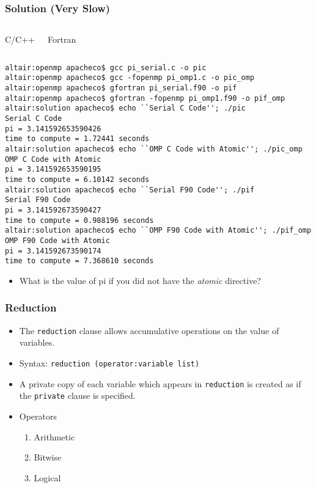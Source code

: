 \documentclass[c,mathserif,compress,xcolor=svgnames]{beamer}
\newenvironment{bblock}[0]
{
\begin{beamerboxesrounded}[upper=uppercol1,lower=lowercol1,shadow=true]}
{\end{beamerboxesrounded}}
\newenvironment{eblock}[0]
{
\begin{beamerboxesrounded}[upper=uppercol2,lower=lowercol2,shadow=true]}
{\end{beamerboxesrounded}}
\begin{document}
\begin{frame}
  \frametitle{\small Solution (Very Slow)}
  \begin{columns}
    \begin{eblock}{C/C++}
      
    \end{eblock}
    \begin{eblock}{Fortran}
      
    \end{eblock}
  \end{columns}
  \begin{bblock}{}
    {\tiny
      \begin{verbatim}
altair:openmp apacheco$ gcc pi_serial.c -o pic
altair:openmp apacheco$ gcc -fopenmp pi_omp1.c -o pic_omp
altair:openmp apacheco$ gfortran pi_serial.f90 -o pif
altair:openmp apacheco$ gfortran -fopenmp pi_omp1.f90 -o pif_omp
altair:solution apacheco$ echo ``Serial C Code''; ./pic
Serial C Code
pi = 3.141592653590426
time to compute = 1.72441 seconds
altair:solution apacheco$ echo ``OMP C Code with Atomic''; ./pic_omp
OMP C Code with Atomic
pi = 3.141592653590195
time to compute = 6.10142 seconds
altair:solution apacheco$ echo ``Serial F90 Code''; ./pif
Serial F90 Code
pi = 3.141592673590427
time to compute = 0.988196 seconds
altair:solution apacheco$ echo ``OMP F90 Code with Atomic''; ./pif_omp
OMP F90 Code with Atomic
pi = 3.141592673590174
time to compute = 7.368610 seconds
      \end{verbatim}
    }
  \end{bblock}
  \begin{itemize}
    \item What is the value of pi if you did not have the \textit{atomic} directive?
  \end{itemize}
\end{frame}

\begin{frame}
  \frametitle{\small Reduction}
  \begin{itemize}
    \item The \texttt{reduction} clause allows accumulative operations on the value of variables.
    \item Syntax: \texttt{reduction (operator:variable list)}
    \item A private copy of each variable which appears in \texttt{reduction} is created as if the \texttt{private} clause is specified.
    \item Operators
    \begin{enumerate}
      \item Arithmetic
      \item Bitwise
      \item Logical
    \end{enumerate}
  \end{itemize}
\end{frame}
\end{document}
